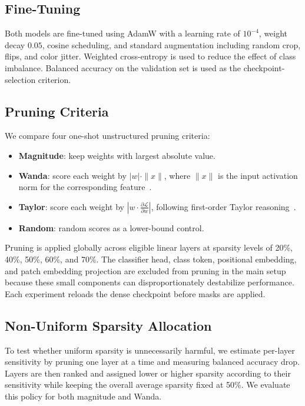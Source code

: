 \documentclass[11pt]{article}
\begin{document}
\subsection{Fine-Tuning}
Both models are fine-tuned using AdamW with a learning rate of $10^{-4}$, weight decay $0.05$, cosine scheduling, and standard augmentation including random crop, flips, and color jitter. Weighted cross-entropy is used to reduce the effect of class imbalance. Balanced accuracy on the validation set is used as the checkpoint-selection criterion.

\subsection{Pruning Criteria}
We compare four one-shot unstructured pruning criteria:
\begin{itemize}[leftmargin=1.2em]
    \item \textbf{Magnitude}: keep weights with largest absolute value.
    \item \textbf{Wanda}: score each weight by $|w| \cdot \|x\|$, where $\|x\|$ is the input activation norm for the corresponding feature~\cite{sun2023wanda}.
    \item \textbf{Taylor}: score each weight by $|w \cdot \frac{\partial \mathcal{L}}{\partial w}|$, following first-order Taylor reasoning~\cite{molchanov2017taylor}.
    \item \textbf{Random}: random scores as a lower-bound control.
\end{itemize}

Pruning is applied globally across eligible linear layers at sparsity levels of 20\%, 40\%, 50\%, 60\%, and 70\%. The classifier head, class token, positional embedding, and patch embedding projection are excluded from pruning in the main setup because these small components can disproportionately destabilize performance. Each experiment reloads the dense checkpoint before masks are applied.

\subsection{Non-Uniform Sparsity Allocation}
To test whether uniform sparsity is unnecessarily harmful, we estimate per-layer sensitivity by pruning one layer at a time and measuring balanced accuracy drop. Layers are then ranked and assigned lower or higher sparsity according to their sensitivity while keeping the overall average sparsity fixed at 50\%. We evaluate this policy for both magnitude and Wanda.
\end{document}
